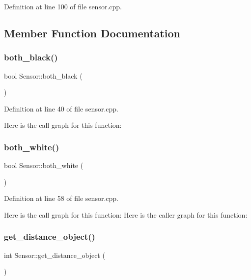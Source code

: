 Definition at line 100 of file sensor.\+cpp.



\subsection{Member Function Documentation}
\mbox{\label{class_sensor_a32ebdbb3ba6fbe19739a10b17dc11cba}} 
\subsubsection{\texorpdfstring{both\+\_\+black()}{both\_black()}}
{\footnotesize\ttfamily bool Sensor\+::both\+\_\+black (\begin{DoxyParamCaption}{ }\end{DoxyParamCaption})}



Definition at line 40 of file sensor.\+cpp.

Here is the call graph for this function\+:
\mbox{\label{class_sensor_add2279da6d407ed7678064ab1fe7d02d}} 
\subsubsection{\texorpdfstring{both\+\_\+white()}{both\_white()}}
{\footnotesize\ttfamily bool Sensor\+::both\+\_\+white (\begin{DoxyParamCaption}{ }\end{DoxyParamCaption})}



Definition at line 58 of file sensor.\+cpp.

Here is the call graph for this function\+:
Here is the caller graph for this function\+:
\mbox{\label{class_sensor_a118f38dcb8a695ad78b7c7d94f508d4f}} 
\subsubsection{\texorpdfstring{get\+\_\+distance\+\_\+object()}{get\_distance\_object()}}
{\footnotesize\ttfamily int Sensor\+::get\+\_\+distance\+\_\+object (\begin{DoxyParamCaption}{ }\end{DoxyParamCaption})}



